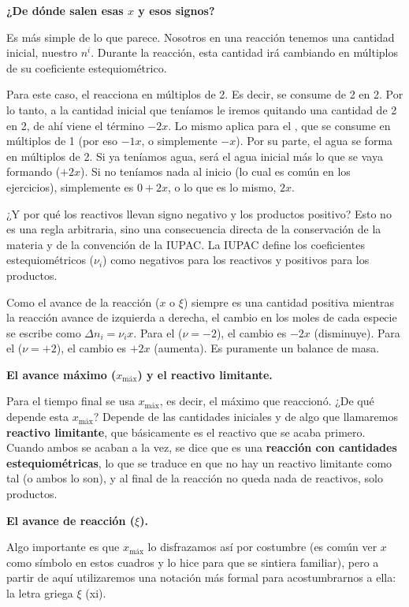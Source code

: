 \medskip
\textbf{¿De dónde salen esas \(x\) y esos signos?}

Es más simple de lo que parece. Nosotros en una reacción tenemos
una cantidad inicial, nuestro \(n^i\). Durante la reacción, esta
cantidad irá cambiando en múltiplos de su coeficiente
estequiométrico.

Para este caso, el  reacciona en múltiplos de 2. Es decir,
se consume de 2 en 2. Por lo tanto, a la cantidad inicial que
teníamos le iremos quitando una cantidad de 2 en 2, de ahí viene
el término \(- 2x\). Lo mismo aplica para el , que se
consume en múltiplos de 1 (por eso \(- 1x\), o simplemente
\(-x\)). Por su parte, el agua se forma en múltiplos de 2. Si ya
teníamos agua, será el agua inicial más lo que se vaya formando
(\(+ 2x\)). Si no teníamos nada al inicio (lo cual es común en
los ejercicios), simplemente es \(0 + 2x\), o lo que es lo mismo,
\(2x\).

¿Y por qué los reactivos llevan signo negativo y los productos
positivo? Esto no es una regla arbitraria, sino una consecuencia
directa de la conservación de la materia y de la convención de
la IUPAC. La IUPAC define los coeficientes estequiométricos
(\(\nu_i\)) como negativos para los reactivos y positivos para
los productos. 

Como el avance de la reacción (\(x\) o \(\xi\)) siempre es una
cantidad positiva mientras la reacción avance de izquierda a
derecha, el cambio en los moles de cada especie se escribe como
\(\Delta n_i = \nu_i x\). Para el  (\(\nu = -2\)), el
cambio es \(-2x\) (disminuye). Para el  (\(\nu = +2\)),
el cambio es \(+2x\) (aumenta). Es puramente un balance de masa.

\textbf{El avance máximo (\(x_{\text{máx}}\)) y el reactivo limitante.}

Para el tiempo final se usa \(x_{\text{máx}}\), es decir, el máximo que
reaccionó. ¿De qué depende esta \(x_{\text{máx}}\)? Depende de las
cantidades iniciales y de algo que llamaremos \textbf{reactivo
limitante}, que básicamente es el reactivo que se acaba primero.
Cuando ambos se acaban a la vez, se dice que es una
\textbf{reacción con cantidades estequiométricas}, lo que se
traduce en que no hay un reactivo limitante como tal (o ambos lo
son), y al final de la reacción no queda nada de reactivos, solo
productos.

\medskip
\textbf{El avance de reacción (\(\xi\)).}

Algo importante es que \(x_{\text{máx}}\) lo disfrazamos así por
costumbre (es común ver \(x\) como símbolo en estos cuadros y lo
hice para que se sintiera familiar), pero a partir de aquí
utilizaremos una notación más formal para acostumbrarnos a ella:
la letra griega \(\xi\) (xi). 

